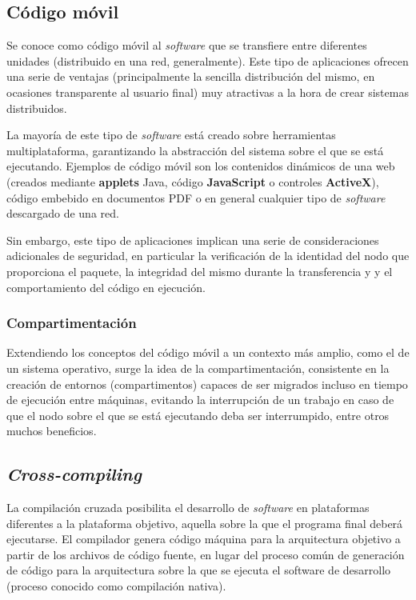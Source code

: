 \subsection{Código móvil}
\label{teoria:codigomovil}

Se conoce como código móvil al \textit{software} que se transfiere entre diferentes unidades (distribuido en una red, generalmente). Este tipo de aplicaciones ofrecen una serie de ventajas (principalmente la sencilla distribución del mismo, en ocasiones transparente al usuario final) muy atractivas a la hora de crear sistemas distribuidos.

La mayoría de este tipo de \textit{software} está creado sobre herramientas multiplataforma, garantizando la abstracción del sistema sobre el que se está ejecutando. Ejemplos de código móvil son los contenidos dinámicos de una web (creados mediante \textbf{applets} Java, código \textbf{JavaScript} o controles \textbf{ActiveX}), código embebido en documentos PDF o en general cualquier tipo de \textit{software} descargado de una red.

Sin embargo, este tipo de aplicaciones implican una serie de consideraciones adicionales de seguridad, en particular la verificación de la identidad del nodo que proporciona el paquete, la integridad del mismo durante la transferencia y \citationneeded y el comportamiento del código en ejecución.

\subsubsection{Compartimentación}

Extendiendo los conceptos del código móvil a un contexto más amplio, como el de un sistema operativo, surge la idea de la compartimentación, consistente en la creación de entornos (compartimentos) capaces de ser migrados incluso en tiempo de ejecución entre máquinas, evitando la interrupción de un trabajo en caso de que el nodo sobre el que se está ejecutando deba ser interrumpido, entre otros muchos beneficios.

\subsection{\textit{Cross-compiling}}

La compilación cruzada posibilita el desarrollo de \textit{software} en plataformas diferentes a la plataforma objetivo, aquella sobre la que el programa final deberá ejecutarse. El compilador genera código máquina para la arquitectura objetivo a partir de los archivos de código fuente, en lugar del proceso común de generación de código para la arquitectura sobre la que se ejecuta el software de desarrollo (proceso conocido como compilación nativa).

